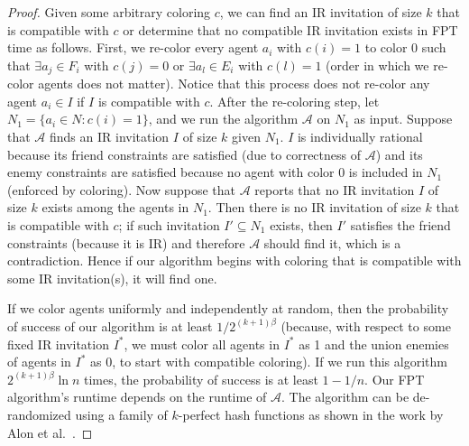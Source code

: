\begin{proof}
	Given some arbitrary coloring $c$, we can find an IR invitation of size $k$ that is compatible with $c$ or determine that no compatible IR invitation exists in FPT time as follows.
	First, we re-color every agent $a_i$ with $c(i)=1$ to color $0$ such that $\exists a_j\in F_i$ with $c(j)=0$ or $\exists a_l \in E_i$ with $c(l) = 1$ (order in which we re-color agents does not matter).
	Notice that this process does not re-color any agent $a_i\in I$ if $I$ is compatible with $c$. After the re-coloring step, let $N_1 = \{a_i\in N: c(i) = 1\}$, and we run the algorithm $\mathcal{A}$ on $N_1$ as input. Suppose that $\mathcal{A}$ finds an IR invitation $I$ of size $k$ given $N_1$. $I$ is individually rational because its friend constraints are satisfied (due to correctness of $\mathcal{A}$) and its enemy constraints are satisfied because no agent with color $0$ is included in $N_1$ (enforced by coloring). Now suppose that $\mathcal{A}$ reports that no IR invitation $I$ of size $k$ exists among the agents in $N_1$. Then there is no IR invitation of size $k$ that is compatible with $c$; if such invitation $I' \subseteq N_1$ exists, then $I'$ satisfies the friend constraints (because it is IR) and therefore $\mathcal{A}$ should find it, which is a contradiction. Hence if our algorithm begins with coloring that is compatible with some IR invitation(s), it will find one.

	If we color agents uniformly and independently at random, then the probability of success of our algorithm is at least $1/2^{(k+1)\beta}$ (because, with respect to some fixed IR invitation $I^*$, we must color all agents in $I^*$ as 1 and the union enemies of agents in $I^*$ as 0, to start with compatible coloring). If we run this algorithm $2^{(k+1)\beta}\ln n$ times, the probability of success is at least $1 - 1/n$. Our FPT algorithm's runtime depends on the runtime of $\mathcal{A}$. The algorithm can be de-randomized using a family of $k$-perfect hash functions as shown in the work by Alon et al.~\cite{ColorCoding}.
\end{proof}



